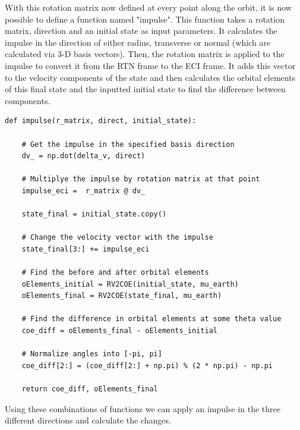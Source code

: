 \documentclass[12pt,twocolumn]{article}  %
\begin{document}
With this rotation matrix now defined at every point along the orbit, it is now possible to define a function named "impulse". This function
takes a rotation matrix, direction and an initial state as input parameters. It calculates the impulse in the direction of either 
radius, transverse or normal (which are calculated via 3-D basis vectors). Then, the rotation matrix is applied to the impulse to convert
it from the RTN frame to the ECI frame. It adds this vector to the velocity components of the state and then calculates the orbital 
elements of this final state and the inputted initial state to find the difference between components. 
\begin{lstlisting}
def impulse(r_matrix, direct, initial_state):
    
    # Get the impulse in the specified basis direction
    dv_ = np.dot(delta_v, direct)
    
    # Multiplye the impulse by rotation matrix at that point
    impulse_eci =  r_matrix @ dv_
    
    state_final = initial_state.copy()
    
    # Change the velocity vector with the impulse
    state_final[3:] += impulse_eci
    
    # Find the before and after orbital elements
    oElements_initial = RV2COE(initial_state, mu_earth)
    oElements_final = RV2COE(state_final, mu_earth)
    
    # Find the difference in orbital elements at some theta value 
    coe_diff = oElements_final - oElements_initial
    
    # Normalize angles into [-pi, pi]
    coe_diff[2:] = (coe_diff[2:] + np.pi) % (2 * np.pi) - np.pi
    
    return coe_diff, oElements_final
\end{lstlisting}

Using these combinations of functions we can apply an impulse in the three different directions and calculate the changes.
\end{document}
